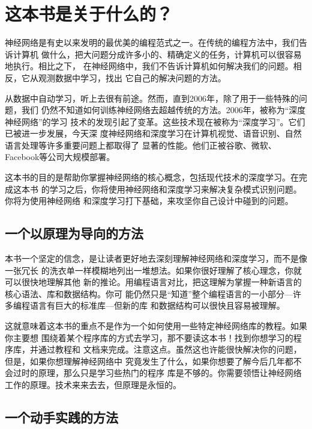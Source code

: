 
\chapter{这本书是关于什么的？}
\label{ch:About}

神经网络是有史以来发明的最优美的编程范式之一。在传统的编程方法中，我们告诉计算机
做什么，把大问题分成许多小的、精确定义的任务，计算机可以很容易地执行。相比之下，
在神经网络中，我们不告诉计算机如何解决我们的问题。相反，它从观测数据中学习，找出
它自己的解决问题的方法。

从数据中自动学习，听上去很有前途。然而，直到2006年，除了用于一些特殊的问题，我们
仍然不知道如何训练神经网络去超越传统的方法。2006年，被称为``深度神经网络''的学习
技术的发现引起了变革。这些技术现在被称为``深度学习''。它们已被进一步发展，今天深
度神经网络和深度学习在计算机视觉、语音识别、自然语言处理等许多重要问题上都取得了
显著的性能。他们正被谷歌、微软、Facebook等公司大规模部署。

这本书的目的是帮助你掌握神经网络的核心概念，包括现代技术的深度学习。在完成这本书
的学习之后，你将使用神经网络和深度学习来解决复杂模式识别问题。你将为使用神经网络
和深度学习打下基础，来攻坚你自己设计中碰到的问题。

\section*{一个以原理为导向的方法}
\label{sec:PrincipleOrientedApproach}

本书一个坚定的信念，是让读者更好地去深刻理解神经网络和深度学习，而不是像一张冗长
的洗衣单一样模糊地列出一堆想法。如果你很好理解了核心理念，你就可以很快地理解其他
新的推论。用编程语言对比，把这理解为掌握一种新语言的核心语法、库和数据结构。你可
能仍然只是``知道''整个编程语言的一小部分---许多编程语言有巨大的标准库---但新的库
和数据结构可以很快且容易被理解。

这就意味着这本书的重点不是作为一个如何使用一些特定神经网络库的教程。如果你主要想
围绕着某个程序库的方式去学习，那不要读这本书！找到你想学习的程序库，并通过教程和
文档来完成。注意这点。虽然这也许能很快解决你的问题，但是，如果你想理解神经网络中
究竟发生了什么，如果你想要了解今后几年都不会过时的原理，那么只是学习些热门的程序
库是不够的。你需要领悟让神经网络工作的原理。技术来来去去，但原理是永恒的。

\section*{一个动手实践的方法}
\label{sec:HandsOnApproach}


